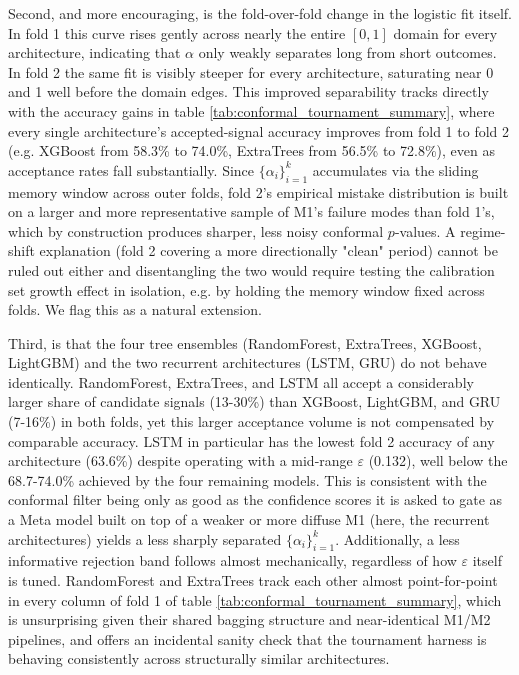 \documentclass[12pt, a4paper]{article}
\begin{document}
\medskip

Second, and more encouraging, is the fold-over-fold change in the logistic fit itself. In fold 1 this curve rises gently across nearly the entire 
$[0,1]$ domain for every architecture, indicating that $\alpha$ only weakly separates long from short outcomes. In fold 2 the same fit is visibly steeper for every architecture, 
saturating near 0 and 1 well before the domain edges. This improved separability tracks directly with the accuracy gains in table \ref{tab:conformal_tournament_summary}, where every 
single architecture's accepted-signal accuracy improves from fold 1 to fold 2 (e.g. XGBoost from 58.3\% to 74.0\%, ExtraTrees from 56.5\% to 72.8\%), even as acceptance rates 
fall substantially. Since \( \{\alpha_i\}_{i=1}^{k} \) accumulates via the sliding memory window across outer folds, 
fold 2's empirical mistake distribution is built on a larger and more representative sample of M1's failure modes than fold 1's, which by construction produces sharper, 
less noisy conformal $p$-values. A regime-shift explanation (fold 2 covering a more directionally "clean" period) cannot be ruled out either and disentangling the two would 
require testing the calibration set growth effect in isolation, e.g. by holding the memory window fixed across folds. We flag this as a natural extension.

\medskip

Third, is that the four tree ensembles (RandomForest, ExtraTrees, XGBoost, LightGBM) and the two recurrent architectures (LSTM, GRU) do not behave 
identically. RandomForest, ExtraTrees, and LSTM all accept a considerably larger share of candidate signals (13-30\%) than XGBoost, LightGBM, and GRU (7-16\%) in both folds, 
yet this larger acceptance volume is not compensated by comparable accuracy. LSTM in particular has the lowest fold 2 accuracy of any architecture (63.6\%) despite operating 
with a mid-range $\varepsilon$ (0.132), well below the 68.7-74.0\% achieved by the four remaining models. This is consistent with the conformal filter being only as good as the 
confidence scores it is asked to gate as a Meta model built on top of a weaker or more diffuse M1 (here, the recurrent architectures) yields a less sharply separated 
\( \{\alpha_i\}_{i=1}^{k} \). Additionally, a less informative rejection band follows almost mechanically, regardless of how $\varepsilon$ itself is tuned. RandomForest and 
ExtraTrees track each other almost point-for-point in every column of fold 1 of table \ref{tab:conformal_tournament_summary}, which is unsurprising given their shared bagging structure 
and near-identical M1/M2 pipelines, and offers an incidental sanity check that the tournament harness is behaving consistently across structurally similar architectures.
\end{document}

